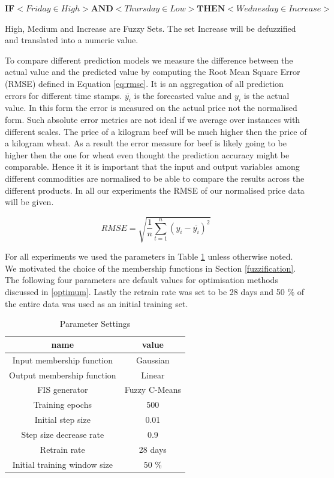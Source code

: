 \centerline {$ \textbf{IF} <  Friday \in High> \textbf{AND} < Thursday \in Low > \textbf{THEN} <  Wednesday \in Increase > $} 

High, Medium and Increase are Fuzzy Sets. The set Increase will be defuzzified and translated into a numeric value. 


To compare different prediction models we measure the difference between the actual value and the predicted value by computing the Root Mean Square Error (RMSE) defined in Equation \ref{eq:rmse}. It is an aggregation of all prediction errors for different time stamps.  $\overline{y_i}$ is the forecasted value and $y_i$ is the actual value. In this form the error is measured on the actual price not the normalised form. Such absolute error metrics are not ideal if we average over instances with different scales. The price of a kilogram beef will be much higher then the price of a kilogram wheat. As a result the error measure for beef is likely going to be higher then the one for wheat even thought the prediction accuracy might be comparable. Hence it it is important that the input and output variables among different commodities are normalised to be able to compare the results across the different products. In all our experiments the RMSE of our normalised price data will be given. 


\begin{equation} \label{eq:rmse}
RMSE = \sqrt{\frac{1}{n}\sum_{t=1}^{n} (y_i -  \overline{y_i})^2}
 \end{equation}



For all experiments we used the parameters in Table \ref{tab:abcde} unless otherwise noted. We motivated the choice of the membership functions in Section \ref{fuzzification}. The following four parameters are default values for optimisation methods discussed in \ref{optimum}. Lastly the retrain rate was set to be 28 days and 50 \% of the entire data was used as an initial training set. 


\begin{table}[H]
\centering
\begin{tabular}{ |c|c| } 

 name & value \\ 
  \hline
 Input membership function & Gaussian \\ 
 Output membership function & Linear \\ 
 FIS generator& Fuzzy C-Means \\ 
 Training epochs & 500 \\ 
 Initial step size & 0.01 \\ 
 Step size decrease rate & 0.9\\ 
 Retrain rate & 28 days \\ 
 Initial training window size & 50 \% \\ 

\end{tabular}
\caption{Parameter Settings}
\label{tab:abcde}
\end{table}



